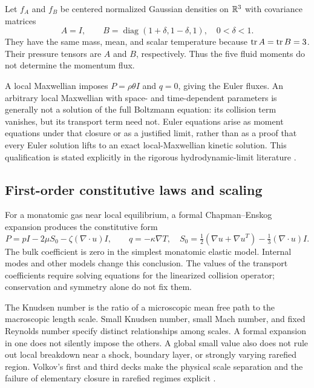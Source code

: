 \begin{example}
\label{ex:micro-unclosed}
Let $f_A$ and $f_B$ be centered normalized Gaussian densities on
$\mathbb{R}^3$ with covariance matrices
\[
 A=I,\qquad B=\operatorname{diag}(1+\delta,1-\delta,1),
 \quad0<\delta<1.
\]
They have the same mass, mean, and scalar temperature because
$\operatorname{tr} A=\operatorname{tr} B=3$.  Their pressure tensors are $A$ and $B$,
respectively.  Thus the five fluid moments do not determine the
momentum flux.
\end{example}

A local Maxwellian imposes $P=\rho\theta I$ and $q=0$, giving
the Euler fluxes.  An arbitrary local Maxwellian with space- and
time-dependent parameters is generally not a solution of the full
Boltzmann equation: its collision term vanishes, but its transport
term need not.  Euler equations arise as moment equations under
that closure or as a justified limit, rather than as a proof that
every Euler solution lifts to an exact local-Maxwellian kinetic
solution.  This qualification is stated explicitly in the rigorous
hydrodynamic-limit literature \citep{microGolseSaintRaymond2009}.

\subsection{First-order constitutive laws and scaling}

For a monatomic gas near local equilibrium, a formal
Chapman--Enskog expansion produces the constitutive form
\begin{equation}
 P=pI-2\mu S_0-\zeta(\nabla\cdot u)I,
 \qquad q=-\kappa\nabla T,
 \quad
 S_0=\tfrac12(\nabla u+\nabla u^T)
          -\tfrac13(\nabla\cdot u)I.
 \label{eq:micro-constitutive}
\end{equation}
The bulk coefficient is zero in the simplest monatomic elastic
model.  Internal modes and other models change this conclusion.
The values of the transport coefficients require solving equations
for the linearized collision operator; conservation and symmetry
alone do not fix them.

The Knudsen number is the ratio of a microscopic mean free path to
the macroscopic length scale.  Small Knudsen number, small Mach number,
and fixed Reynolds number specify distinct relationships among
scales.  A formal expansion in one does not silently impose the
others.  A global small value also does not rule out local breakdown
near a shock, boundary layer, or strongly varying rarefied region.
Volkov's first and third decks make the physical scale separation
and the failure of elementary closure in rarefied regimes explicit
\citep{microVolkov01,microVolkov03}.

